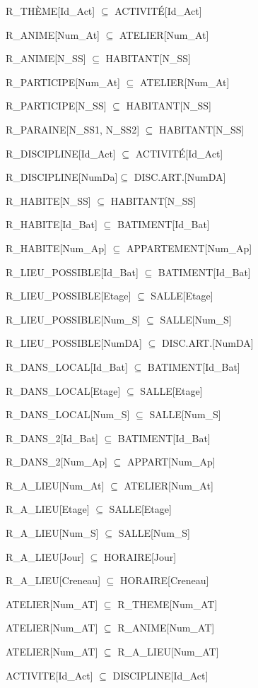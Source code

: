 \documentclass[a4paper,10.5pt]{report}
\begin{document}
	R\_THÈME[Id\_Act] $\subseteq$ ACTIVITÉ[Id\_Act]

	R\_ANIME[Num\_At] $\subseteq$ ATELIER[Num\_At]

	R\_ANIME[N\_SS] $\subseteq$ HABITANT[N\_SS]

	R\_PARTICIPE[Num\_At] $\subseteq$ ATELIER[Num\_At]

	R\_PARTICIPE[N\_SS] $\subseteq$ HABITANT[N\_SS]

	R\_PARAINE[N\_SS1, N\_SS2] $\subseteq$ HABITANT[N\_SS]

	R\_DISCIPLINE[Id\_Act] $\subseteq$ ACTIVITÉ[Id\_Act]

	R\_DISCIPLINE[NumDa]$\subseteq$ DISC.ART.[NumDA]

	R\_HABITE[N\_SS] $\subseteq$ HABITANT[N\_SS]

	R\_HABITE[Id\_Bat] $\subseteq$ BATIMENT[Id\_Bat]

	R\_HABITE[Num\_Ap] $\subseteq$ APPARTEMENT[Num\_Ap]

	R\_LIEU\_POSSIBLE[Id\_Bat] $\subseteq$ BATIMENT[Id\_Bat]

	R\_LIEU\_POSSIBLE[Etage] $\subseteq$ SALLE[Etage]

	R\_LIEU\_POSSIBLE[Num\_S] $\subseteq$ SALLE[Num\_S]

	R\_LIEU\_POSSIBLE[NumDA] $\subseteq$ DISC.ART.[NumDA]

	R\_DANS\_LOCAL[Id\_Bat] $\subseteq$ BATIMENT[Id\_Bat]

	R\_DANS\_LOCAL[Etage] $\subseteq$ SALLE[Etage]

	R\_DANS\_LOCAL[Num\_S] $\subseteq$ SALLE[Num\_S]

	R\_DANS\_2[Id\_Bat] $\subseteq$ BATIMENT[Id\_Bat]

	R\_DANS\_2[Num\_Ap] $\subseteq$ APPART[Num\_Ap]

	R\_A\_LIEU[Num\_At] $\subseteq$ ATELIER[Num\_At]

	R\_A\_LIEU[Etage] $\subseteq$ SALLE[Etage]

	R\_A\_LIEU[Num\_S] $\subseteq$ SALLE[Num\_S]

	R\_A\_LIEU[Jour] $\subseteq$ HORAIRE[Jour]

	R\_A\_LIEU[Creneau] $\subseteq$ HORAIRE[Creneau]

	ATELIER[Num\_AT] $\subseteq$ R\_THEME[Num\_AT]

	ATELIER[Num\_AT] $\subseteq$ R\_ANIME[Num\_AT]

	ATELIER[Num\_AT] $\subseteq$ R\_A\_LIEU[Num\_AT]

	ACTIVITE[Id\_Act] $\subseteq$ DISCIPLINE[Id\_Act]
\end{document}
